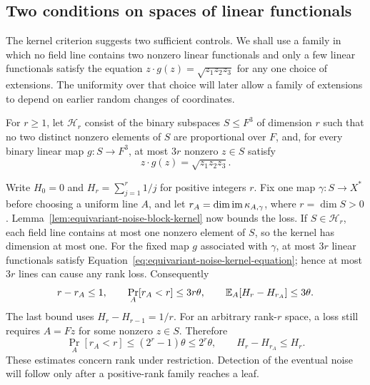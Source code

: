 \subsection{Two conditions on spaces of linear functionals}

The kernel criterion suggests two sufficient controls.  We shall use a
family in which no field line contains two nonzero linear functionals and only a few
linear functionals satisfy the equation $z\cdot g(z)=\sqrt{z_1z_2z_3}$ for any one choice of extensions.
The uniformity over that choice will later allow a family of extensions to depend on earlier
random changes of coordinates.

\begin{definition}
For $r\ge1$, let $\mathcal H_r$ consist of the binary subspaces
$S\le F^3$ of dimension $r$ such that no two distinct nonzero elements of $S$ are proportional over $F$, and,
for every binary linear map $g:S\to F^3$, at most $3r$ nonzero $z\in S$
satisfy
\begin{equation}\label{eq:equivariant-noise-kernel-equation}
 z\cdot g(z)=\sqrt{z_1z_2z_3}.
\end{equation}
\end{definition}

Write $H_0=0$ and $H_r=\sum_{j=1}^r1/j$ for positive integers $r$.
Fix one map $\gamma:S\to X^*$ before choosing a uniform line $A$, and let
$r_A=\dim\operatorname{im}\kappa_{A,\gamma}$, where $r=\dim S>0$.
Lemma~\ref{lem:equivariant-noise-block-kernel} now bounds the loss.  If $S\in\mathcal H_r$,
each field line contains at most one nonzero element of $S$, so the kernel
has dimension at most one.  For the fixed map $g$ associated with
$\gamma$, at most $3r$ linear functionals satisfy Equation~\eqref{eq:equivariant-noise-kernel-equation};
hence at most $3r$ lines can cause any rank loss.  Consequently
\begin{equation}\label{eq:equivariant-noise-subspace-conditions-rank-loss}
 r-r_A\le1,\qquad
 \Pr_A[r_A<r]\le3r\theta,\qquad
 \mathbb E_A[H_r-H_{r_A}]\le3\theta.
\end{equation}
The last bound uses $H_r-H_{r-1}=1/r$.
For an arbitrary rank-$r$ space, a loss still requires $A=Fz$ for some
nonzero $z\in S$.  Therefore
\begin{equation}\label{eq:equivariant-noise-arbitrary-rank-loss}
 \Pr_A[r_A<r]\le(2^r-1)\theta\le2^r\theta,
 \qquad H_r-H_{r_A}\le H_r.
\end{equation}
These estimates concern rank under restriction.  Detection of the eventual
noise will follow only after a positive-rank family reaches a leaf.

